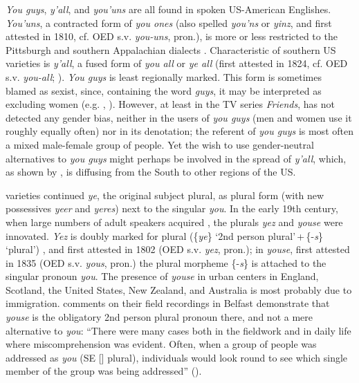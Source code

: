 \documentclass[output=paper,hidelinks]{langscibook}
\begin{document}
\textit{You guys}, \textit{y’all}, and \textit{you’uns} are all found in spoken US-American Englishes. \textit{You’uns}, a contracted form of \textit{you ones} (also spelled \textit{you’ns} or \textit{yinz}, and first attested in 1810, cf. OED s.v. \textit{you-uns}, pron.), is more or less restricted to the Pittsburgh and southern Appalachian dialects \citep[81]{Wolfram2016}. Characteristic of southern US varieties is \textit{y’all}, a fused form of \textit{you all} or \textit{ye all} (first attested in 1824, cf. OED s.v. \textit{you-all}; \citealt{Montgomery1992}). \textit{You guys} is least regionally marked. This form is sometimes blamed as sexist, since, containing the word \textit{guys}, it may be interpreted as excluding women (e.g. \citealt{Saul2016}, \citealt[417]{Maynor2000}). However, at least in the TV series \textit{Friends}, \citet{Heyd2010} has not detected any gender bias, neither in the users of \textit{you guys} (men and women use it roughly equally often) nor in its denotation; the referent of \textit{you guys} is most often a mixed male-female group of people. Yet the wish to use gender-neutral alternatives to \textit{you guys} might perhaps be involved in the spread of \textit{y’all}, which, as shown by \citet{Tillery2000}, is diffusing from the South to other regions of the US.

 varieties continued \textit{ye}, the original subject plural, as plural form (with new possessives \textit{yeer} and \textit{yeres}) next to the singular \textit{you}. In the early 19th century, when large numbers of adult  speakers acquired , the plurals \textit{yez} and \textit{youse} were innovated. \textit{Yez} is doubly marked for plural (\{\textit{ye}\} \enquote*{2nd person plural}\,+\,\{-\textit{s}\} \enquote*{plural}) \citep[351]{Hickey2003}, and first attested in 1802 (OED s.v. \textit{yez}, pron.); in \textit{youse}, first attested in 1835 (OED s.v. \textit{yous}, pron.) the plural morpheme \{-\textit{s}\} is attached to the singular pronoun \textit{you}. The presence of \textit{youse} in urban centers in England, Scotland, the United States, New Zealand, and Australia is most probably due to  immigration.  comments on their field recordings in Belfast demonstrate that \textit{youse} is the obligatory 2nd person plural pronoun there, and not a mere alternative to \textit{you}: \enquote{There were many cases both in the fieldwork and in daily life where miscomprehension was evident. Often, when a group of people was addressed as \textit{you} (SE [] plural), individuals would look round to see which single member of the group was being addressed} (\citeyear[20--21]{MilroyMilroy2012}).
\end{document}
